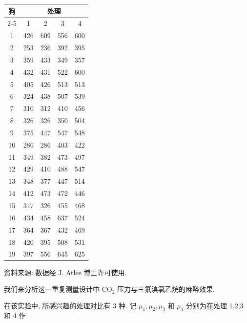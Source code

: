 \begin{mvtable}
\label{tab:6.2}
\centering
{\small
\begin{tabular}{|c|c|c|c|c|}
\hline
\multirow{2}{*}{狗} & \multicolumn{4}{c|}{处理}\\
\cline{2-5}
 & 1 & 2 & 3 & 4\\
\hline
1 & 426 & 609 & 556 & 600\\
2 & 253 & 236 & 392 & 395\\
3 & 359 & 433 & 349 & 357\\
4 & 432 & 431 & 522 & 600\\
5 & 405 & 426 & 513 & 513\\
6 & 324 & 438 & 507 & 539\\
7 & 310 & 312 & 410 & 456\\
8 & 326 & 326 & 350 & 504\\
9 & 375 & 447 & 547 & 548\\
10 & 286 & 286 & 403 & 422\\
11 & 349 & 382 & 473 & 497\\
12 & 429 & 410 & 488 & 547\\
13 & 348 & 377 & 447 & 514\\
14 & 412 & 473 & 472 & 446\\
15 & 347 & 326 & 455 & 468\\
16 & 434 & 458 & 637 & 524\\
17 & 364 & 367 & 432 & 469\\
18 & 420 & 395 & 508 & 531\\
19 & 397 & 556 & 645 & 625\\
\hline
\end{tabular}}
\end{mvtable}

\noindent 资料来源: 数据经 J. Atlee 博士许可使用.

我们来分析这一重复测量设计中 $\mathrm{CO}_{2}$ 压力与三氟溴氯乙烷的麻醉效果.

在该实验中, 所感兴趣的处理对比有 3 种. 记 $\mu_{1},\mu_{2},\mu_{3}$ 和 $\mu_{4}$ 分别为在处理 1,2,3 和 4 作
